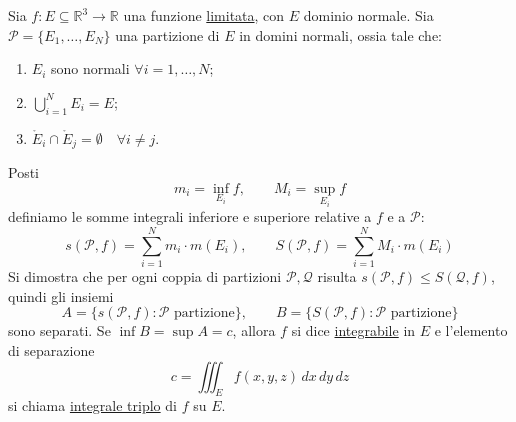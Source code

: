 \begin{definition}
Sia $f : E \subseteq \mathbb{R}^3 \to \mathbb{R}$ una funzione \underline{limitata}, con $E$ dominio normale. Sia $\mathcal{P} = \{ E_1, \dots, E_N \}$ una partizione di $E$ in domini normali, ossia tale che:
\begin{enumerate}
    \item $E_i$ sono normali $\forall i = 1, \dots, N$;
    \item $\displaystyle\bigcup_{i=1}^N E_i = E$;
    \item $\mathring{E}_i \cap \mathring{E}_j = \emptyset \quad \forall i \neq j$.
\end{enumerate}
Posti
\[
m_i = \inf_{E_i} f, \qquad M_i = \sup_{E_i} f
\]
definiamo le somme integrali inferiore e superiore relative a $f$ e a $\mathcal{P}$:
\[
s(\mathcal{P}, f) = \sum_{i=1}^N m_i \cdot m(E_i), \qquad S(\mathcal{P}, f) = \sum_{i=1}^N M_i \cdot m(E_i)
\]
Si dimostra che per ogni coppia di partizioni $\mathcal{P}, \mathcal{Q}$ risulta $s(\mathcal{P}, f) \le S(\mathcal{Q}, f)$, quindi gli insiemi
\[
A = \{ s(\mathcal{P}, f) : \mathcal{P} \text{ partizione} \}, \qquad B = \{ S(\mathcal{P}, f) : \mathcal{P} \text{ partizione} \}
\]
sono separati. Se $\inf B = \sup A = c$, allora $f$ si dice \underline{integrabile} in $E$ e l'elemento di separazione
\[
c = \iiint_E f(x, y, z)\, dx\, dy\, dz
\]
si chiama \underline{integrale triplo} di $f$ su $E$.
\end{definition}

